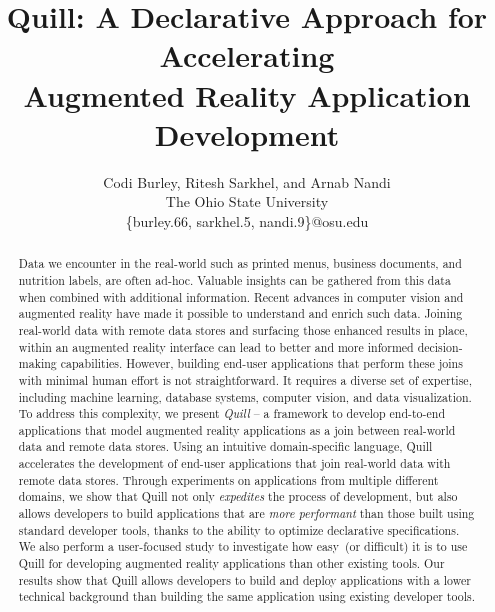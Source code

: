 \documentclass[11pt]{article}
\begin{document}
\title{Quill: A Declarative Approach for Accelerating\\ Augmented Reality Application Development}
\author{
Codi Burley, Ritesh Sarkhel, and Arnab Nandi\\
The Ohio State University\\
\{burley.66, sarkhel.5, nandi.9\}@osu.edu
}
\maketitle
\begin{abstract}
Data we encounter in the real-world such as printed menus, business documents, and nutrition labels, are often ad-hoc. Valuable insights can be gathered from this data when combined with additional information.
Recent advances in computer vision and augmented reality have made it possible to understand and enrich such data.
Joining real-world data with remote data stores and surfacing those enhanced results in place, within an augmented reality interface can lead to better and more informed decision-making capabilities. 
However, building end-user applications that perform these joins with minimal human effort is not straightforward. It requires a diverse set of expertise, including machine learning, database systems, computer vision, and data visualization.
To address this complexity, we present \emph{Quill} -- a framework to develop end-to-end applications that model augmented reality applications as a join between real-world data and remote data stores. 
Using an intuitive domain-specific language, Quill accelerates the development of end-user applications that join real-world data with remote data stores.
Through experiments on applications from multiple different domains, we show that Quill not only \textit{expedites} the process of development, but also allows developers to build applications that are \textit{more performant} than those built using standard developer tools, thanks to the ability to optimize declarative specifications.
We also perform a user-focused study to investigate how easy~(or difficult) it is to use Quill for developing augmented reality applications than other existing tools.
Our results show that Quill allows developers to build and deploy applications with a lower technical background than building the same application using existing developer tools.
\end{abstract}
\end{document}
